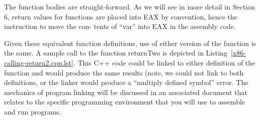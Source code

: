 The function bodies are straight-forward. As we will see in more
detail in Section 6, return values for functions are placed into EAX
by convention, hence the instruction to move the con- tents of ``var''
into EAX in the assembly code.

\begin{figure}

\vspace{-0.25in}
\end{figure}

Given these equivalent function definitions, use of either version of
the function is the same.  A sample call to the function returnTwo is
depicted in Listing~\ref{x86-calling-return2.cpp.lst}. This C++ code
could be linked to either definition of the function and would produce
the same results (note, we could not link to both definitions, or the
linker would produce a ``multiply defined symbol'' error. The
mechanics of program linking will be discussed in an associated
document that relates to the specific programming environment that you
will use to assemble and run programs.
